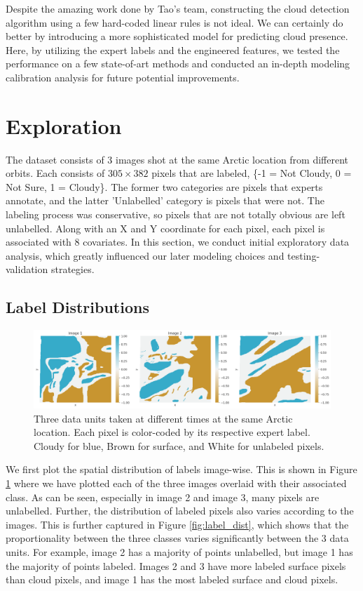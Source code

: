 \documentclass[11pt, letterpaper, journal]{IEEEtran}
\begin{document}
Despite the amazing work done by Tao's team, constructing the cloud detection algorithm using a few hard-coded linear rules is not ideal. We can certainly do better by introducing a more sophisticated model for predicting cloud presence. Here, by utilizing the expert labels and the engineered features, we tested the performance on a few state-of-art methods and conducted an in-depth modeling calibration analysis for future potential improvements. 

\section{Exploration}
The dataset consists of 3 images shot at the same Arctic location from different orbits. Each consists of $305 \times 382$ pixels that are labeled, \{-1 = Not Cloudy, 0 = Not Sure, 1 = Cloudy\}. The former two categories are pixels that experts annotate, and the latter 'Unlabelled' category is pixels that were not. The labeling process was conservative, so pixels that are not totally obvious are left unlabelled. Along with an X and Y coordinate for each pixel, each pixel is associated with 8 covariates. In this section, we conduct initial exploratory data analysis, which greatly influenced our later modeling choices and testing-validation strategies.

\subsection{Label Distributions}
\begin{figure}[!h]
\centering
\includegraphics[width=1.0\textwidth]{1.a.png}
\caption{Three data units taken at different times at the same Arctic location. Each pixel is color-coded by its respective expert label. Cloudy for blue, Brown for surface, and White for unlabeled pixels.}
\label{fig:image_labels}
\end{figure}

We first plot the spatial distribution of labels image-wise. This is shown in Figure \ref{fig:image_labels} where we have plotted each of the three images overlaid with their associated class. As can be seen, especially in image 2 and image 3, many pixels are unlabelled. Further, the distribution of labeled pixels also varies according to the images. This is further captured in Figure \ref{fig:label_dist}, which shows that the proportionality between the three classes varies significantly between the 3 data units. For example, image 2 has a majority of points unlabelled, but image 1 has the majority of points labeled. Images 2 and 3 have more labeled surface pixels than cloud pixels, and image 1 has the most labeled surface and cloud pixels.
\end{document}
